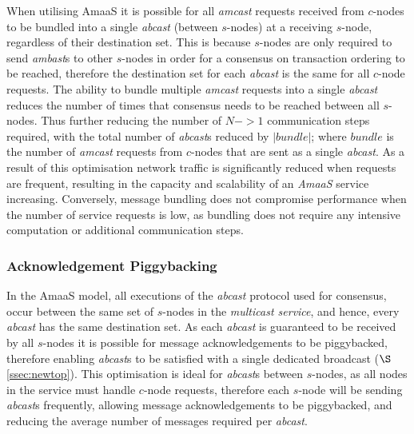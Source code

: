 		When utilising \textsf{AmaaS} it is possible for all \emph{amcast} requests received from $c$-nodes to be bundled into a single \emph{abcast} (between $s$-nodes) at a receiving $s$-node, regardless of their destination set.  This is because $s$-nodes are only required to send \emph{ambast}s to other $s$-nodes in order for a consensus on transaction ordering to be reached, therefore the destination set for each \emph{abcast} is the same for all $c$-node requests.   The ability to bundle multiple \emph{amcast} requests into a single \emph{abcast} reduces the number of times that consensus needs to be reached between all $s$-nodes.  Thus further reducing the number of $N->1$ communication steps required, with the total number of \emph{abcast}s reduced by $\left\vert bundle \right\vert$; where $bundle$ is the number of  \emph{amcast} requests from $c$-nodes that are sent as a single \emph{abcast}.  As a result of this optimisation network traffic is significantly reduced when requests are frequent, resulting in the capacity and scalability of an \emph{AmaaS} service increasing. Conversely, message bundling does not compromise performance when the number of service requests is low, as bundling does not require any intensive computation or additional communication steps.  
		
		\subsubsection*{Acknowledgement Piggybacking}
		In the \textsf{AmaaS} model, all executions of the \emph{abcast} protocol used for consensus, occur between the same set of $s$-nodes in the \emph{multicast service}, and hence, every \emph{abcast} has the same destination set.  As each \emph{abcast} is guaranteed to be received by all $s$-nodes it is possible for message acknowledgements to be piggybacked, therefore enabling \emph{abcast}s to be satisfied with a single dedicated broadcast ($\S$ \ref{ssec:newtop}).  This optimisation is ideal for \emph{abcast}s between $s$-nodes, as all nodes in the service must handle $c$-node requests, therefore each $s$-node will be sending \emph{abcast}s frequently, allowing message acknowledgements to be piggybacked, and reducing the average number of messages required per \emph{abcast}.  	
	
